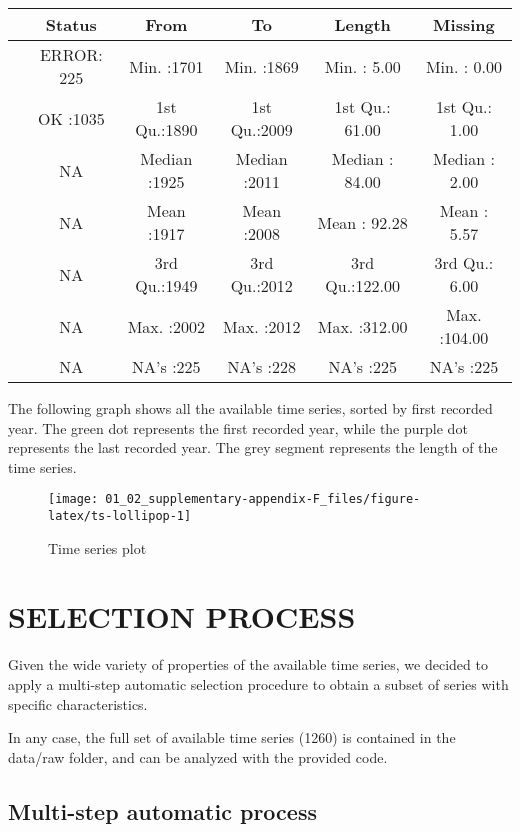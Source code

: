 \documentclass[]{article}
\begin{document}
\begin{longtable}[]{@{}lccccc@{}}
\toprule
& Status & From & To & Length & Missing\tabularnewline
\midrule
\endhead
& ERROR: 225 & Min. :1701 & Min. :1869 & Min. : 5.00 & Min. :
0.00\tabularnewline
& OK :1035 & 1st Qu.:1890 & 1st Qu.:2009 & 1st Qu.: 61.00 & 1st Qu.:
1.00\tabularnewline
& NA & Median :1925 & Median :2011 & Median : 84.00 & Median :
2.00\tabularnewline
& NA & Mean :1917 & Mean :2008 & Mean : 92.28 & Mean :
5.57\tabularnewline
& NA & 3rd Qu.:1949 & 3rd Qu.:2012 & 3rd Qu.:122.00 & 3rd Qu.:
6.00\tabularnewline
& NA & Max. :2002 & Max. :2012 & Max. :312.00 & Max.
:104.00\tabularnewline
& NA & NA's :225 & NA's :228 & NA's :225 & NA's :225\tabularnewline
\bottomrule
\end{longtable}

The following graph shows all the available time series, sorted by first
recorded year. The green dot represents the first recorded year, while
the purple dot represents the last recorded year. The grey segment
represents the length of the time series.

\begin{figure}[h]

{\centering \texttt{[image: 01\_02\_supplementary-appendix-F\_files/figure-latex/ts-lollipop-1]} 

}

\caption{\label{fig:ts-lollipop} Time series plot}\label{fig:ts-lollipop}
\end{figure}

\newpage

\hypertarget{selection-process}{%
\section{SELECTION PROCESS}\label{selection-process}}

Given the wide variety of properties of the available time series, we
decided to apply a multi-step automatic selection procedure to obtain a
subset of series with specific characteristics.

In any case, the full set of available time series (1260) is contained
in the data/raw folder, and can be analyzed with the provided code.

\hypertarget{multi-step-automatic-process}{%
\subsection{Multi-step automatic
process}\label{multi-step-automatic-process}}
\end{document}

